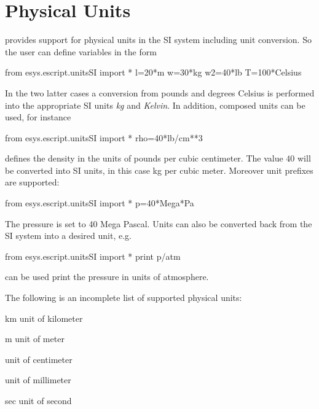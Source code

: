 \section{Physical Units}
\escript provides support for physical units in the SI system
including unit conversion. So the user can define variables in the form
\begin{python}
  from esys.escript.unitsSI import *
  l=20*m
  w=30*kg
  w2=40*lb
  T=100*Celsius
\end{python}
In the two latter cases a conversion from pounds and degrees
Celsius is performed into the appropriate SI units \emph{kg}
and \emph{Kelvin}.
In addition, composed units can be used, for instance
\begin{python}
  from esys.escript.unitsSI import *
  rho=40*lb/cm**3
\end{python}
defines the density in the units of pounds per cubic centimeter.
The value $40$ will be converted into SI units, in this case kg per cubic
meter. Moreover unit prefixes are supported:
\begin{python}
  from esys.escript.unitsSI import *
  p=40*Mega*Pa
\end{python}
The pressure  is set to 40 Mega Pascal. Units can also be converted
back from the SI system into a desired unit, e.g.
\begin{python}
  from esys.escript.unitsSI import *
  print p/atm
\end{python}
can be used print the pressure in units of atmosphere.

The following is an incomplete list of supported physical units:

\begin{datadesc}{km}
unit of kilometer
\end{datadesc}

\begin{datadesc}{m}
unit of meter
\end{datadesc}

\begin{datadesc}{cm}
unit of centimeter
\end{datadesc}

\begin{datadesc}{mm}
unit of millimeter
\end{datadesc}

\begin{datadesc}{sec}
unit of second
\end{datadesc}

